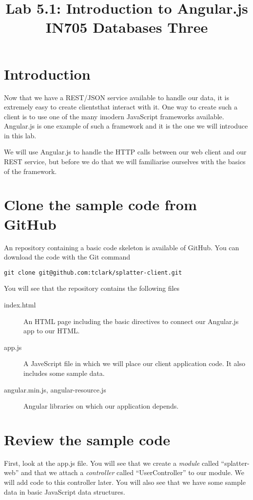 \documentclass{article}
\begin{document}
\title{Lab 5.1: Introduction to Angular.js\\ IN705 Databases Three}
\date{}
\maketitle

\section*{Introduction}
Now that we have a REST/JSON service available to handle our data, it is extremely easy to create clientsthat interact with it.  One way to create such a client is to use one of the many imodern JavaScript frameworks available.  Angular.js is one example of such a framework and it is the one we will introduce in this lab.

We will use Angular.js to handle the HTTP calls between our web client and our REST service, but before we do that we will familiarise ourselves with the basics of the framework.


\section{Clone the sample code from GitHub}
An repository containing a basic code skeleton is available of GitHub. You can download the code with the Git command

\texttt{git clone git@github.com:tclark/splatter-client.git}

You will see that the repository contains the following files
\begin{description}
  \item[index.html] An HTML page including the basic directives to connect our Angular.js app to our HTML.
  \item[app.js] A JaveScript file in which we will place our client application code.  It also includes some sample data.
  \item[angular.min.js, angular-resource.js]Angular libraries on which our application depends.
\end{description}

\section{Review the sample code}
First, look at the app.js file.  You will see that we create a \emph{module} called ``splatter-web'' and that we attach a \emph{controller} called ``UserController'' to our module.  We will add code to this controller later.  You will also see that we have some sample data in basic JavaScript data structures.
\end{document}
